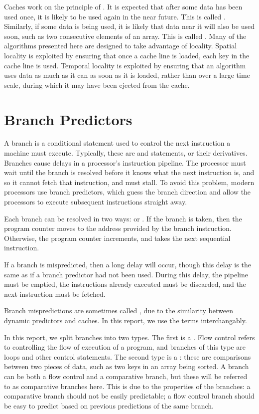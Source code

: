 Caches work on the principle of . It is expected that after some
data has been used once, it is likely to be used again in the near future. This
is called . Similarly, if some data is being used, it is
likely that data near it will also be used soon, such as two consecutive
elements of an array. This is called . Many of the
algorithms presented here are designed to take advantage of locality. Spatial
locality is exploited by ensuring that once a cache line is loaded, each key in
the cache line is used. Temporal locality is exploited by ensuring that an
algorithm uses data as much as it can as soon as it is loaded, rather than over
a large time scale, during which it may have been ejected from the cache.

\section{Branch Predictors}

A branch is a conditional statement used to control the next instruction a
machine must execute. Typically, these are  and  statements,
or their derivatives. Branches cause delays in a processor's instruction
pipeline. The processor must wait until the branch is resolved before it knows
what the next instruction is, and so it cannot fetch that instruction, and must
stall. To avoid this problem, modern processors use branch predictors, which
guess the branch direction and allow the processors to execute subsequent
instructions straight away.

Each branch can be resolved in two ways:  or . If the
branch is taken, then the program counter moves to the address provided by the
branch instruction. Otherwise, the program counter increments, and takes the
next sequential instruction.

If a branch is mispredicted, then a long delay will occur, though this delay is
the same as if a branch predictor had not been used. During this delay, the
pipeline must be emptied, the instructions already executed must be discarded,
and the next instruction must be fetched.

Branch mispredictions are sometimes called , due to the
similarity between dynamic predictors and caches. In this report, we use the
terms interchangably.

In this report, we split branches into two types. The first is a . Flow control refers to controlling the flow of execution of a
program, and branches of this type are loops and other control statements.
The second type is a : these are comparisons between two
pieces of data, such as two keys in an array being sorted. A branch can be both
a flow control and a comparative branch, but these will be referred to as
comparative branches here. This is due to the properties of the branches: a
comparative branch should not be easily predictable; a flow control branch
should be easy to predict based on previous predictions of the same branch.

